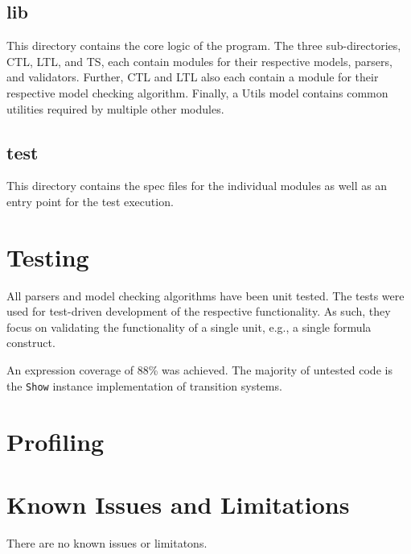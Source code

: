 \documentclass[11pt]{article}
\begin{document}
\subsection{lib}

This directory contains the core logic of the program.
The three sub-directories, CTL, LTL, and TS, each contain modules for their respective models, parsers, and validators.
Further, CTL and LTL also each contain a module for their respective model checking algorithm.
Finally, a Utils model contains common utilities required by multiple other modules. 

\subsection{test}

This directory contains the spec files for the individual modules as well as an entry point for the test execution.

\section{Testing}


All parsers and model checking algorithms have been unit tested.
The tests were used for test-driven development of the respective functionality.
As such, they focus on validating the functionality of a single unit, e.g., a single formula construct.

An expression coverage of 88\% was achieved.
The majority of untested code is the \verb|Show| instance implementation of transition systems. 

\section{Profiling}


\section{Known Issues and Limitations}

There are no known issues or limitatons.
\end{document}
